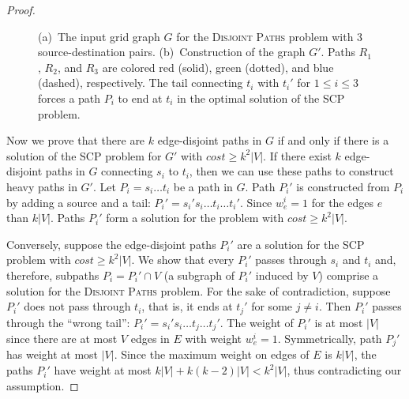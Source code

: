 \documentclass{llncs}
\newcommand{\SCoP}{\textsc{SCP}}
\newcommand{\EDP}{\textsc{Disjoint Paths}}
\begin{document}
\begin{proof}
\begin{figure}[h!]
    \center
    \caption{\small (a)~The input grid graph $G$ for the \EDP{} problem with
    3 source-destination pairs.
    (b)~Construction of the graph $G'$. Paths $R_1$, $R_2$, and $R_3$
    are colored red (solid), green (dotted), and blue (dashed), respectively.
    The tail connecting $t_i$ with $t_i'$ for $1\le i\le 3$ forces a
    path $P_i$ to end at $t_i$ in the optimal
    solution of the \SCoP{} problem.}
    \label{fig:gprime}
\end{figure}



Now we prove that there are $k$ edge-disjoint paths in $G$ if and only
if there is a solution of the \SCoP{} problem for $G'$ with $cost \ge
k^2|V|$. If there exist $k$ edge-disjoint paths in $G$ connecting
$s_i$ to $t_i$, then we can use these paths to construct heavy paths in
$G'$. Let $P_i=s_i\dots t_i$ be a path in $G$. Path $P_i'$ is
constructed from $P_i$ by adding a source and a tail:
$P_i'=s_i's_i\dots t_i\dots t_i'$. Since $w^i_e=1$ for the edges $e$
than $k|V|$. Paths $P_i'$ form a solution for the problem with
$cost\ge k^2|V|$.



Conversely, suppose the edge-disjoint paths $P_i'$ are a solution for
the \SCoP{} problem with $cost\ge k^2|V|$. We show that every $P_i'$
passes through $s_i$ and $t_i$ and, therefore, subpaths $P_i=P_i'\cap
V$ (a subgraph of $P_i'$ induced by $V$)
comprise a solution for the \EDP{} problem. For the sake of
contradiction, suppose $P_i'$ does not pass through $t_i$, that is, it
ends at $t_j'$ for some $j\neq i$. Then $P_i'$ passes through the
``wrong tail'': $P_i'=s_i's_i\dots t_j \dots t_j'$. The weight of
$P_i'$ is at most $|V|$ since there are at most $V$ edges in $E$ with
weight $w^i_{e}=1$. Symmetrically, path $P_j'$ has weight at most
$|V|$. Since the maximum weight on edges of $E$ is $k|V|$, the paths
$P_i'$ have weight at most $k|V| + k(k-2)|V| < k^2|V|$, thus
contradicting our assumption.

\end{proof}
\end{document}
